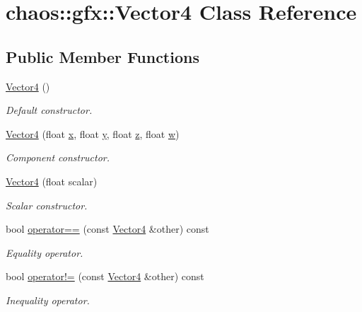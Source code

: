 \hypertarget{classchaos_1_1gfx_1_1_vector4}{\section{chaos\-:\-:gfx\-:\-:Vector4 Class Reference}
\label{classchaos_1_1gfx_1_1_vector4}
}
\subsection*{Public Member Functions}
\begin{DoxyCompactItemize}
\item 
\hyperlink{classchaos_1_1gfx_1_1_vector4_abdee87e0c5bbd7a9870957951f2bba80}{Vector4} ()
\begin{DoxyCompactList}\small\item\em Default constructor. \end{DoxyCompactList}\item 
\hyperlink{classchaos_1_1gfx_1_1_vector4_a8e22c6ae7ba175d15bd8804cff77519e}{Vector4} (float \hyperlink{classchaos_1_1gfx_1_1_vector4_a74f8e26ec8f6c55a11ed5a423fb0eec4}{x}, float \hyperlink{classchaos_1_1gfx_1_1_vector4_aa823679c8ce9d8b882f7e05f5670ee74}{y}, float \hyperlink{classchaos_1_1gfx_1_1_vector4_ae1e282cb0c262db6c20f29c34d727938}{z}, float \hyperlink{classchaos_1_1gfx_1_1_vector4_a3cd40a2e6ce1fd10a0d2c8136965e9dd}{w})
\begin{DoxyCompactList}\small\item\em Component constructor. \end{DoxyCompactList}\item 
\hyperlink{classchaos_1_1gfx_1_1_vector4_aa2630f2dfef3d7a9ae5b284be502f528}{Vector4} (float scalar)
\begin{DoxyCompactList}\small\item\em Scalar constructor. \end{DoxyCompactList}\item 
bool \hyperlink{classchaos_1_1gfx_1_1_vector4_add5671fb46f71d2196a68e2746309463}{operator==} (const \hyperlink{classchaos_1_1gfx_1_1_vector4}{Vector4} \&other) const 
\begin{DoxyCompactList}\small\item\em Equality operator. \end{DoxyCompactList}\item 
bool \hyperlink{classchaos_1_1gfx_1_1_vector4_ae0ac2f2346e0e56523f8f263286d3954}{operator!=} (const \hyperlink{classchaos_1_1gfx_1_1_vector4}{Vector4} \&other) const 
\begin{DoxyCompactList}\small\item\em Inequality operator. \end{DoxyCompactList}\end{DoxyCompactItemize}

